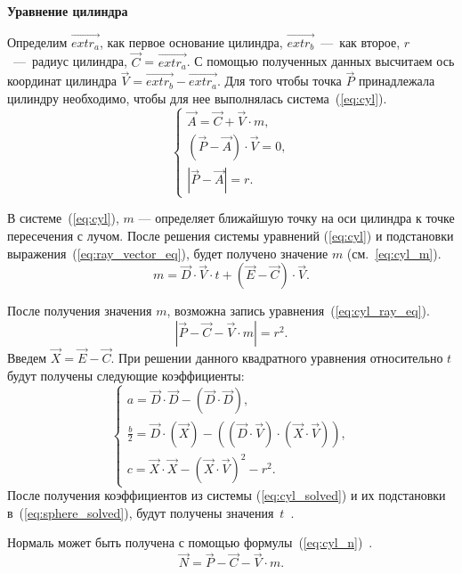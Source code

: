 \textbf{Уравнение цилиндра}

Определим $\vec{extr_a}$, как первое основание цилиндра, $\vec{extr_b}$~---~как второе,
$r$~---~радиус цилиндра, $\vec{C}$ = $\vec{extr_a}$. С помощью полученных данных высчитаем ось координат цилиндра $\vec{V} = \vec{extr_b} - \vec{extr_a}$.
Для того чтобы точка $\vec{P}$ принадлежала цилиндру необходимо, чтобы для нее выполнялась система~(\ref{eq:cyl}).
\begin{equation}
	\begin{cases}
	\vec{A} = \vec{C} + \vec{V} \cdot m, \\
	(\vec{P} - \vec{A}) \cdot \vec{V} = 0, \\
	|\vec{P}-\vec{A}| = r. 
	\end{cases}
	\label{eq:cyl}
\end{equation}

В системе~(\ref{eq:cyl}), $m$ --- определяет ближайшую точку на оси цилиндра к точке пересечения с лучом. После решения системы уравнений (\ref{eq:cyl})  и подстановки выражения~(\ref{eq:ray_vector_eq}), будет получено значение $m$ (см.~\ref{eq:cyl_m}).
\begin{equation}
	m = \vec{D} \cdot \vec{V} \cdot t  + (\vec{E} - \vec{C}) \cdot \vec{V}.
	\label{eq:cyl_m}
\end{equation}

После получения значения $m$, возможна запись уравнения~(\ref{eq:cyl_ray_eq}).
\begin{equation}
 	|\vec{P}-\vec{C}-\vec{V} \cdot m| = r^{2}.
	\label{eq:cyl_ray_eq}
\end{equation}
Введем $\vec{X} = \vec{E} - \vec{C}$.
При решении данного квадратного уравнения относительно $t$ будут получены следующие коэффициенты:
\begin{equation}
	\begin{cases}
		a = \vec{D} \cdot \vec{D} - (\vec{D} \cdot \vec{D}), \\
		\frac{b}{2} = \vec{D} \cdot (\vec{X}) - ((\vec{D} \cdot \vec{V}) \cdot (\vec{X} \cdot \vec{V})), \\
		c = \vec{X} \cdot \vec{X} - (\vec{X} \cdot \vec{V})^{2} - r^{2}.
	\end{cases}
	\label{eq:cyl_solved}
\end{equation}
После получения коэффициентов из системы (\ref{eq:cyl_solved}) и их подстановки в~(\ref{eq:sphere_solved}), будут получены значения~$t$~\cite{cyl_inter}.

Нормаль может быть получена с помощью формулы~(\ref{eq:cyl_n})~\cite{cyl_inter}.
\begin{equation}
	\vec{N} = \vec{P} - \vec{C} - \vec{V} \cdot m.
	\label{eq:cyl_n}
\end{equation} 



